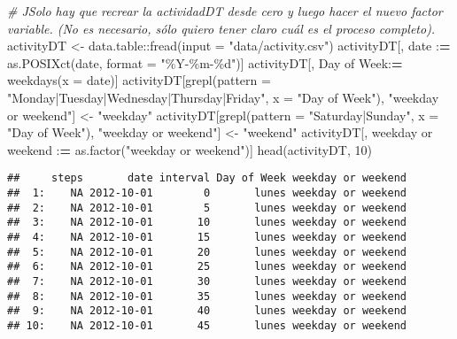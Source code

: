 \documentclass[
]{article}
\newenvironment{Shaded}{\begin{snugshade}}{\end{snugshade}}
\newcommand{\AttributeTok}[1]{\textcolor[rgb]{0.77,0.63,0.00}{#1}}
\newcommand{\CommentTok}[1]{\textcolor[rgb]{0.56,0.35,0.01}{\textit{#1}}}
\newcommand{\DecValTok}[1]{\textcolor[rgb]{0.00,0.00,0.81}{#1}}
\newcommand{\ErrorTok}[1]{\textcolor[rgb]{0.64,0.00,0.00}{\textbf{#1}}}
\newcommand{\FunctionTok}[1]{\textcolor[rgb]{0.00,0.00,0.00}{#1}}
\newcommand{\NormalTok}[1]{#1}
\newcommand{\OtherTok}[1]{\textcolor[rgb]{0.56,0.35,0.01}{#1}}
\newcommand{\SpecialCharTok}[1]{\textcolor[rgb]{0.00,0.00,0.00}{#1}}
\newcommand{\StringTok}[1]{\textcolor[rgb]{0.31,0.60,0.02}{#1}}
\begin{document}
\begin{Shaded}
\begin{Highlighting}[]
\CommentTok{\# JSolo hay que recrear la actividadDT desde cero y luego hacer el nuevo factor variable. (No es necesario, sólo quiero tener claro cuál es el proceso completo). }
\NormalTok{activityDT }\OtherTok{\textless{}{-}}\NormalTok{ data.table}\SpecialCharTok{::}\FunctionTok{fread}\NormalTok{(}\AttributeTok{input =} \StringTok{"data/activity.csv"}\NormalTok{)}
\NormalTok{activityDT[, date }\SpecialCharTok{:}\ErrorTok{=} \FunctionTok{as.POSIXct}\NormalTok{(date, }\AttributeTok{format =} \StringTok{"\%Y{-}\%m{-}\%d"}\NormalTok{)]}
\NormalTok{activityDT[, }\StringTok{\textasciigrave{}}\AttributeTok{Day of Week}\StringTok{\textasciigrave{}}\SpecialCharTok{:}\ErrorTok{=} \FunctionTok{weekdays}\NormalTok{(}\AttributeTok{x =}\NormalTok{ date)]}
\NormalTok{activityDT[}\FunctionTok{grepl}\NormalTok{(}\AttributeTok{pattern =} \StringTok{"Monday|Tuesday|Wednesday|Thursday|Friday"}\NormalTok{, }\AttributeTok{x =} \StringTok{"Day of Week"}\NormalTok{), }\StringTok{"weekday or weekend"}\NormalTok{] }\OtherTok{\textless{}{-}} \StringTok{"weekday"}
\NormalTok{activityDT[}\FunctionTok{grepl}\NormalTok{(}\AttributeTok{pattern =} \StringTok{"Saturday|Sunday"}\NormalTok{, }\AttributeTok{x =} \StringTok{"Day of Week"}\NormalTok{), }\StringTok{"weekday or weekend"}\NormalTok{] }\OtherTok{\textless{}{-}} \StringTok{"weekend"}
\NormalTok{activityDT[, }\StringTok{\textasciigrave{}}\AttributeTok{weekday or weekend}\StringTok{\textasciigrave{}} \SpecialCharTok{:}\ErrorTok{=} \FunctionTok{as.factor}\NormalTok{(}\StringTok{"weekday or weekend"}\NormalTok{)]}
\FunctionTok{head}\NormalTok{(activityDT, }\DecValTok{10}\NormalTok{)}
\end{Highlighting}
\end{Shaded}

\begin{verbatim}
##     steps       date interval Day of Week weekday or weekend
##  1:    NA 2012-10-01        0       lunes weekday or weekend
##  2:    NA 2012-10-01        5       lunes weekday or weekend
##  3:    NA 2012-10-01       10       lunes weekday or weekend
##  4:    NA 2012-10-01       15       lunes weekday or weekend
##  5:    NA 2012-10-01       20       lunes weekday or weekend
##  6:    NA 2012-10-01       25       lunes weekday or weekend
##  7:    NA 2012-10-01       30       lunes weekday or weekend
##  8:    NA 2012-10-01       35       lunes weekday or weekend
##  9:    NA 2012-10-01       40       lunes weekday or weekend
## 10:    NA 2012-10-01       45       lunes weekday or weekend
\end{verbatim}
\end{document}

